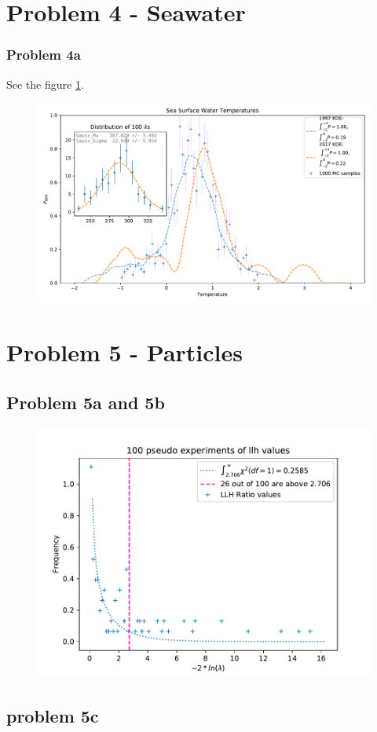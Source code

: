 \documentclass[a4paper,11pt]{article}
\begin{document}
\section{Problem 4 - Seawater}
\subsubsection{Problem 4a}
See the figure \ref{p4_seawater}.

\begin{figure}[H]
  \centering
  \includegraphics[width = 1.3\linewidth]{../p4_seawater}
  \label{p4_seawater}
\end{figure}

\section{Problem 5 - Particles}
\subsection{Problem 5a and 5b}

\begin{figure}[H]
  \includegraphics{../p5_llhratios}
\end{figure}

\subsection{problem 5c }
\end{document}
